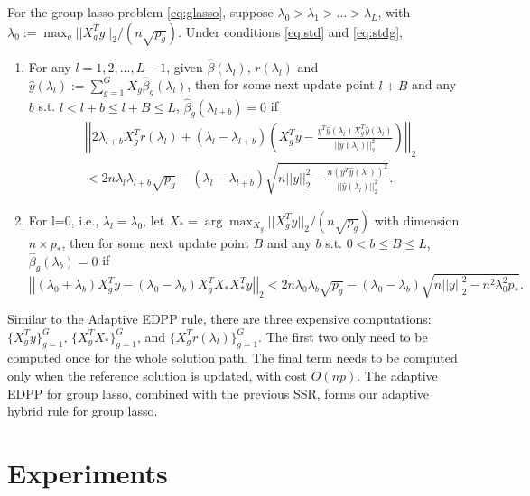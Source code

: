 \begin{theorem}
  For the group lasso problem \eqref{eq:glasso}, suppose $\lambda_0>\lambda_1>...>\lambda_L$, with $\lambda_0:= \max_g ||X_g^Ty||_2 / (n\sqrt{p_g})$. Under conditions \eqref{eq:std} and \eqref{eq:stdg},
    \begin{enumerate}
        \item For any $l=1,2,...,L-1$, given $\hat{\beta}(\lambda_l)$, $r(\lambda_l)$ and $\hat{y}(\lambda_l):=\sum_{g=1}^GX_g\hat{\beta}_g(\lambda_l)$, then for some next update point $l+B$ and any $b$ s.t. $l<l+b\leq l+B\leq L$, $\hat{\beta}_g(\lambda_{l+b})=0$ if
        \begin{equation}
            \begin{split}
                &\left|\left|2\lambda_{l+b}X_g^Tr(\lambda_l)+(\lambda_l-\lambda_{l+b})\left( X_g^Ty-\frac{y^T\hat{y}(\lambda_l)X_g^T\hat{y}(\lambda_l)}{||\hat{y}(\lambda_l)||_2^2}\right)\right|\right|_2\\
                &<2n\lambda_l\lambda_{l+b}\sqrt{p_g}-(\lambda_l-\lambda_{l+b})\sqrt{n||y||_2^2-\frac{n(y^T\hat{y}(\lambda_l))^2}{||\hat{y}(\lambda_l)||_2^2}}.
            \end{split}
        \end{equation}
        \item For l=0, i.e., $\lambda_l=\lambda_0$, let $X_*=\arg \max_{X_g} ||X_g^Ty||_2 / (n\sqrt{p_g})$ with dimension $n\times p_*$, then for some next update point $B$ and any $b$ s.t. $0<b\leq B\leq L$, $\hat{\beta}_g(\lambda_{b})=0$ if
        \begin{equation}
        \left|\left|(\lambda_0+\lambda_b)X_g^Ty-(\lambda_0-\lambda_b)X_g^TX_*X_*^Ty\right|\right|_2<2n\lambda_0\lambda_b\sqrt{p_g}-(\lambda_0-\lambda_b)\sqrt{n||y||_2^2-n^2\lambda_0^2p_*}.
    \end{equation}
    \end{enumerate}
\end{theorem}

Similar to the Adaptive EDPP rule, there are three expensive computations: $\{X_g^Ty\}_{g=1}^G$, $\{X_g^TX_*\}_{g=1}^G$, and $\{X_g^Tr(\lambda_l)\}_{g=1}^G$. The first two only need to be computed once for the whole solution path. The final term needs to be computed only when the reference solution is updated, with cost $O(np)$. The adaptive EDPP for group lasso, combined with the previous SSR, forms our adaptive hybrid rule for group lasso.

\section{Experiments}
\label{sec:experiments}

